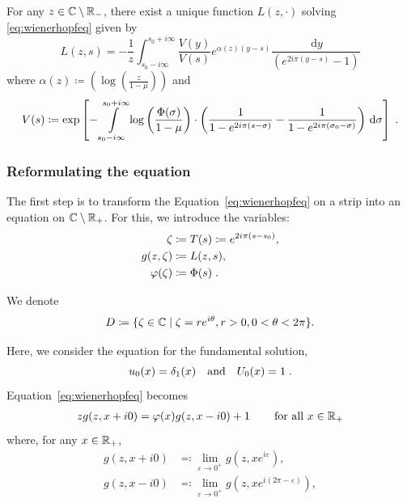 \documentclass[11pt]{amsart}
\newcommand{\diff}{\,\mathrm{d}}
\begin{document}
\begin{theorem}
\label{th:SolutionWH}
For any $z \in \mathbb{C} \setminus \mathbb{R}_-$, there exist a unique function $L(z,\cdot)$ solving \eqref{eq:wienerhopfeq}
given by     
\begin{equation}\label{eq:exprL}
    L(z,s) 
    = 
   - \frac{1}{z}\int_{s_0-i\infty}^{s_0+i\infty} \frac{V(y)}{V(s)} e^{ \alpha(z)(y-s)}
   \frac{\diff y}{(e^{2i\pi(y-s)}-1)}
\end{equation}
where $\alpha(z) \coloneqq  
    \left(\log \left( \frac{z}{1-\mu}\right)\right)$ and 
    \begin{equation}
        V(s) \coloneqq \exp \left[
            - \int\limits_{s_0-i\infty}^{s_0+i\infty}\log \left( \frac{\Phi(\sigma)}{1-\mu}\right)
            \cdot \left(
                \frac{1}{1-e^{2i\pi(s-\sigma)}} - \frac{1}{1-e^{2i\pi(\sigma_0-\sigma)}}
             \right) \diff \sigma 
            \right]
            \label{def:V}
            \eqfinp
        \end{equation}
\end{theorem}

\subsubsection{Reformulating the equation}
\label{s:reformulate_eq}
\mbox{}

The first step is to transform the Equation~\eqref{eq:wienerhopfeq} on a strip into an equation on $\mathbb{C} \setminus \mathbb{R}_+$. For this, we introduce the variables:
    \begin{align}
        \zeta & \coloneqq T(s) \coloneqq e^{2i\pi(s-s_0)}, \label{def:zeta}\\
        g(z,\zeta) &\coloneqq L(z,s), \label{def:g} \\
        \varphi(\zeta) &\coloneqq \Phi(s) \; .
        \label{def:Phi}
    \end{align}

We denote 
\begin{equation}\label{def:D}
D \coloneqq \{ \zeta \in \mathbb{C} \mid \zeta = re^{i\theta}, r > 0, 0 < \theta < 2\pi \}.
\end{equation}


Here, we consider the equation for the fundamental solution, \ie 
$$u_0(x) = \delta_1(x) \quad \text{and} \quad U_0(x) = 1 \; .$$ Equation~\eqref{eq:wienerhopfeq} becomes
\begin{align}
    \label{eq:WH3.5}
    z g(z, x+i0) = \varphi(x)g(z, x-i0) + 1 \, \qquad \text{for all $x\in\mathbb{R}_+$}
\end{align}
where, for any $x \in \mathbb{R}_+$, 
\begin{align*}
    g(z, x+i0) &\eqqcolon \lim_{\varepsilon\to 0^+}  g(z, xe^{i\varepsilon}),\\
    g(z, x-i0) &\eqqcolon \lim_{\varepsilon\to 0^+}  g(z, xe^{i(2\pi-\varepsilon)}),\\
\end{align*}
\end{document}
